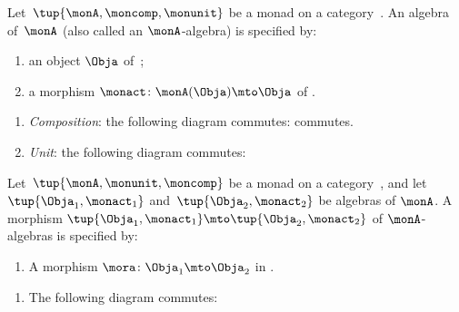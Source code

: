 \begin{ctdefinition}
    \label{def:monad-algebra}
    Let~$\tup{\monA, \moncomp, \monunit}$ be a monad on a category~\CatC.
    An algebra of~$\monA$ (also called an $\monA$-algebra) is specified by: \

    \constit
    \begin{enumerate}
        \item an object $\Obja$ of~\CatC;
        \item a morphism $\monact\colon \monA(\Obja) \mto \Obja$ of \CatC.
    \end{enumerate}
    \condit
    \begin{enumerate}
        \item \emph{Composition}: the following diagram commutes:
              commutes.
        \item \emph{Unit}: the following diagram commutes:

    \end{enumerate}
\end{ctdefinition}



\begin{ctdefinition}
    \label{def:algebramorphism}
    Let~$\tup{\monA, \monunit, \moncomp}$ be a monad on a category~\CatC, and let~$\tup{\Obja_1, \monact_1}$ and~$\tup{\Obja_2, \monact_2}$ be algebras of $\monA$.
    A morphism $\tup{\Obja_1, \monact_1} \mto \tup{\Obja_2, \monact_2}$ of $\monA$-algebras is specified by: \

    \constit
    \begin{enumerate}
        \item A morphism $\mora \colon \Obja_1 \mto \Obja_2$ in \CatC.
    \end{enumerate}
    \condit
    \begin{enumerate}
        \item The following diagram commutes:

    \end{enumerate}
\end{ctdefinition}

